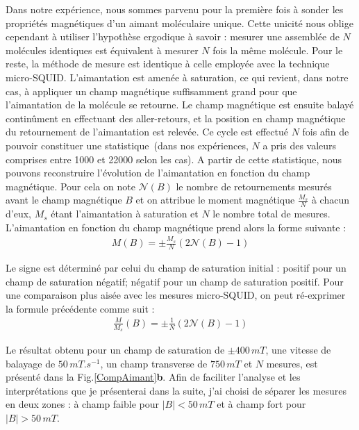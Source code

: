 Dans notre expérience, nous sommes parvenu pour la première fois à sonder les propriétés magnétiques d'un aimant moléculaire unique. Cette unicité nous oblige cependant à utiliser l'hypothèse ergodique à savoir : mesurer une assemblée de $N$ molécules identiques est équivalent à mesurer $N$ fois la même molécule. Pour le reste, la méthode de mesure est identique à celle employée avec la technique micro-SQUID. L'aimantation est amenée à saturation, ce qui revient, dans notre cas, à appliquer un champ magnétique suffisamment grand pour que l'aimantation de la molécule se retourne. Le champ magnétique est ensuite balayé continûment en effectuant des aller-retours, et la position en champ magnétique du retournement de l'aimantation est relevée. Ce cycle est effectué $N$ fois afin de pouvoir constituer une statistique~(dans nos expériences, $N$ a pris des valeurs comprises entre 1000 et 22000 selon les cas). A partir de cette statistique, nous pouvons reconstruire l'évolution de l'aimantation en fonction du champ magnétique. Pour cela on note $\mathscr{N}(B)$ le nombre de retournements mesurés avant le champ magnétique $B$ et on attribue le moment magnétique $\frac{M_s}{N}$ à chacun d'eux, $M_s$ étant l'aimantation à saturation et $N$ le nombre total de mesures. L'aimantation en fonction du champ magnétique prend alors la forme suivante :
\begin{eqnarray}
M(B) =\pm \frac{M_s}{N}(2\mathscr{N}(B) -1)\nonumber
\end{eqnarray}

Le signe est déterminé par celui du champ de saturation initial : positif pour un champ de saturation négatif; négatif pour un champ de saturation positif. Pour une comparaison plus aisée avec les mesures micro-SQUID, on peut ré-exprimer la formule précédente comme suit :
\begin{eqnarray}
\frac{M}{M_s}(B) =\pm \frac{1}{N} (2\mathscr{N}(B) -1)
\end{eqnarray}


Le résultat obtenu pour un champ de saturation de $\pm 400 \, mT$, une vitesse de balayage de $50\,mT.s^{-1}$, un champ transverse de $750\,mT$ et $N$ mesures, est présenté dans la Fig.\ref{CompAimant}\textbf{b}. Afin de faciliter l'analyse et les interprétations que je présenterai dans la suite, j'ai choisi de séparer les mesures en deux zones : à champ faible pour $|B|< 50\,mT$ et à champ fort pour $|B|>50\,mT$.


